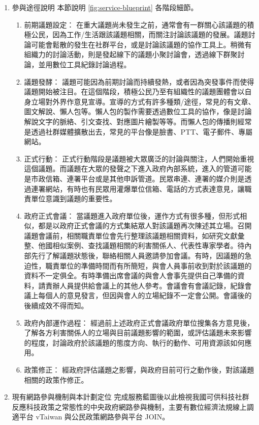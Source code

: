 \documentclass[12pt,a4paper]{article}
\begin{document}
\begin{enumerate}
\item 參與途徑說明
\label{sec:orgba300a0}
本節說明 \ref{fig:service-blueprint} 各階段細節。
\begin{enumerate}
\item 前期議題設定：
\label{sec:org94f24cf}
在重大議題尚未發生之前，通常會有一群關心該議題的積極公民，因為工作/生活跟該議題相關，而關注討論該議題的發展。議題討論可能會鬆散的發生在社群平台，或是討論該議題的協作工具上。稍微有組織力的討論活動，則是發起線下的議題小聚討論會，透過線下群聚討論，並用數位工具紀錄討論過程。
\item 議題發酵：
\label{sec:org69aa47c}
議題可能因為前期討論而持續發熱，或者因為突發事件而使得議題開始被注目。在這個階段，積極公民乃至有組織性的議題團體會以自身立場對外界作意見宣導。宣導的方式有許多種類/途徑，常見的有文章、圖文解說、懶人包等。懶人包的製作需要透過數位工具的協作，像是討論解說文字的脈絡、引文查找、對應圖片繪製等等。而懶人包的傳播則經常是透過社群媒體擴散出去，常見的平台像是臉書、PTT、電子郵件、專屬網站。
\item 正式行動：
\label{sec:org1e25160}
正式行動階段是議題被大眾廣泛的討論與關注，人們開始重視這個議題。而議題在大眾的發聲之下進入政府內部系統，進入的管道可能是市政信箱、連署平台或是其他申訴管道。民眾串連、連署的媒介則是透過連署網站，有時也有民眾用灌爆單位信箱、電話的方式表達意見，讓職責單位意識到議題的重要性。
\item 政府正式會議：
\label{sec:orgac5cd6a}
當議題進入政府單位後，運作方式有很多種，但形式相似，都是以政府正式會議的方式集結眾人對該議題再次陳述其立場。召開議題會議前，相關職責單位會先行整理該議題相關資料，如研究文獻彙整、他國相似案例、查找議題相關的利害關係人、代表性專家學者。待內部先行了解議題狀態後，聯絡相關人員邀請參加會議。有時，因議題的急迫性，職責單位的準備時間而有所簡短，與會人員事前收到對於該議題的資料不一定俱全。有時準備出席會議的與會人會事先提供自己準備的資料，請責辦人員提供給會議上的其他人參考。會議會有會議記錄，紀錄會議上每個人的意見發言，但因與會人的立場紀錄不一定會公開。會議後的後續成效不得而知。
\item 政府內部運作過程：
\label{sec:org0f5e5c8}
經過前上述政府正式會議政府單位搜集各方意見後，了解各方利害關係人的立場與目前議題影響的範圍，或評估議題未來影響的程度，討論政府於該議題的態度方向、執行的動作、可用資源該如何應用。
\item 政策修正：
\label{sec:orgcc4f6fb}
經政府評估議題之影響，與政府目前可行之動作後，對該議題相關的政策作修正。
\end{enumerate}

\item 現有網路參與機制與本計劃定位
\label{sec:org0f1a343}
完成服務藍圖後以此檢視我國可供科技社群反應科技政策之常態性的中央政府網路參與機制，主要有數位經濟法規線上調適平台 vTaiwan 與公民政策網路參與平台 JOIN。


\end{enumerate}
\end{document}
